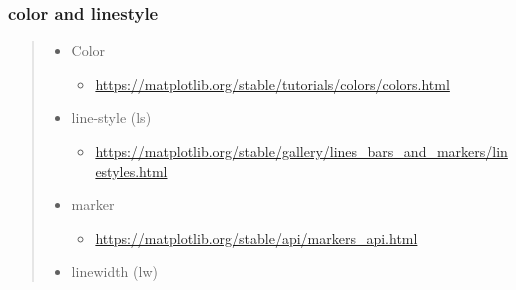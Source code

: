 \documentclass[
]{book}
\providecommand{\tightlist}{%
  \setlength{\itemsep}{0pt}\setlength{\parskip}{0pt}}
\theoremstyle{definition}
\theoremstyle{definition}
\theoremstyle{definition}
\theoremstyle{definition}
\theoremstyle{remark}
\begin{document}
\hypertarget{color-and-linestyle}{%
\subsubsection{color and linestyle}\label{color-and-linestyle}}

\begin{quote}
\begin{itemize}
\tightlist
\item
  Color

  \begin{itemize}
  \tightlist
  \item
    \url{https://matplotlib.org/stable/tutorials/colors/colors.html}
  \end{itemize}
\item
  line-style (ls)

  \begin{itemize}
  \tightlist
  \item
    \url{https://matplotlib.org/stable/gallery/lines_bars_and_markers/linestyles.html}
  \end{itemize}
\item
  marker

  \begin{itemize}
  \tightlist
  \item
    \url{https://matplotlib.org/stable/api/markers_api.html}
  \end{itemize}
\item
  linewidth (lw)
\end{itemize}
\end{quote}
\end{document}
